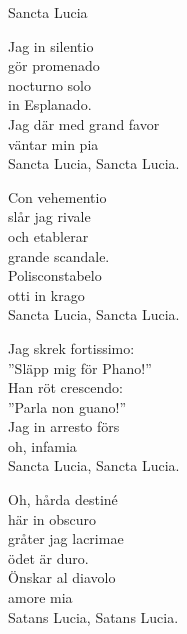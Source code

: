 \begin{song}{Sancta Lucia}
	
	

    \showversenumber	
	Jag in silentio\\
	gör promenado\\
	nocturno solo\\
	in Esplanado.\\
	Jag där med grand favor\\
	väntar min pia\\
	Sancta Lucia, Sancta Lucia.
	
    \showversenumber
	Con vehementio\\
	slår jag rivale\\
	och etablerar\\
	grande scandale.\\
	Polisconstabelo\\
	otti in krago\\
	Sancta Lucia, Sancta Lucia.
	
    \showversenumber
	Jag skrek fortissimo:\\
	''Släpp mig för Phano!''\\
	Han röt crescendo:\\
	''Parla non guano!''\\
	Jag in arresto förs\\
	oh, infamia\\
	Sancta Lucia, Sancta Lucia.
	
    \showversenumber
	Oh, hårda destiné\\
	här in obscuro\\
	gråter jag lacrimae\\
	ödet är duro.\\
	Önskar al diavolo\\
	amore mia\\
	Satans Lucia, Satans Lucia.
	
\end{song}

